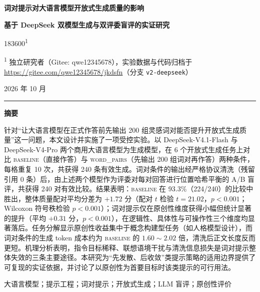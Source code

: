 \documentclass[11pt,a4paper]{article}
\newcommand{\baseline}{\textsc{baseline}}
\newcommand{\wordpairs}{\textsc{word\_pairs}}
\begin{document}
\begin{center}
{\bfseries\heiti 词对提示对大语言模型开放式生成质量的影响\\[0.5em]}
{\bfseries\heiti 基于 DeepSeek 双模型生成与双评委盲评的实证研究\par}
\vspace{1.2em}
{ 183600\textsuperscript{1}\par}
\vspace{0.3em}
{ \textsuperscript{1} 独立研究者（Gitee: qwe12345678），实验数据与代码归档于\\
\url{https://gitee.com/qwe12345678/jkdsfn}（分支 \texttt{v2-deepseek}）\par}
\vspace{0.8em}
{ 2026 年 10 月\par}
\end{center}
\vspace{0.6em}

\noindent\rule{\textwidth}{0.75pt}
\begin{center}
{\bfseries\heiti 摘\quad 要}
\end{center}
\noindent
针对“让大语言模型在正式作答前先输出 200 组灵感词对能否提升开放式生成质量”这一问题，本文设计并实施了一项受控实验。以 DeepSeek-V4.1-Flash 与 DeepSeek-V4-Pro 两个商用大语言模型为生成模型，在 6 个开放式生成任务上对比 \baseline{}（直接作答）与 \wordpairs{}（先输出 200 组词对再作答）两种条件，每格重复 10 次，共获得 240 条有效生成。词对条件的输出经严格协议清洗（残留引用 0 条）后，由上述两个模型作为评委对每对回答进行位置哈希平衡的 A/B 盲评，共获得 240 对有效比较。结果表明：\baseline{} 在 93.3\%（224/240）的比较中胜出，整体质量配对平均分差为 $+1.72$ 分（配对 $t$ 检验 $t=21.02$，$p<0.001$；Wilcoxon 符号秩检验 $p<0.001$）；词对提示仅在原创性维度获得小幅但统计显著的提升（平均 $+0.31$ 分，$p<0.001$），在逻辑性、具体性与可操作性三个维度均显著落后。任务分解显示原创性收益集中于概念构建型任务（如人格模型设计），而词对条件的生成 token 成本约为 \baseline{} 的 $1.60\sim2.02$ 倍，清洗后正文长度反而更短。机理分析表明，指令目标稀释、联想语境干扰与清洗信息损失是词对提示整体失效的三条主要途径。本研究为“先发散、后收敛”类提示策略的适用边界提供了可复现的实证依据，并讨论了以原创性为首要目标时该类提示的可行用法。

\vspace{0.4em}

 大语言模型；提示工程；词对提示；开放式生成；LLM 盲评；原创性评价
\end{document}
